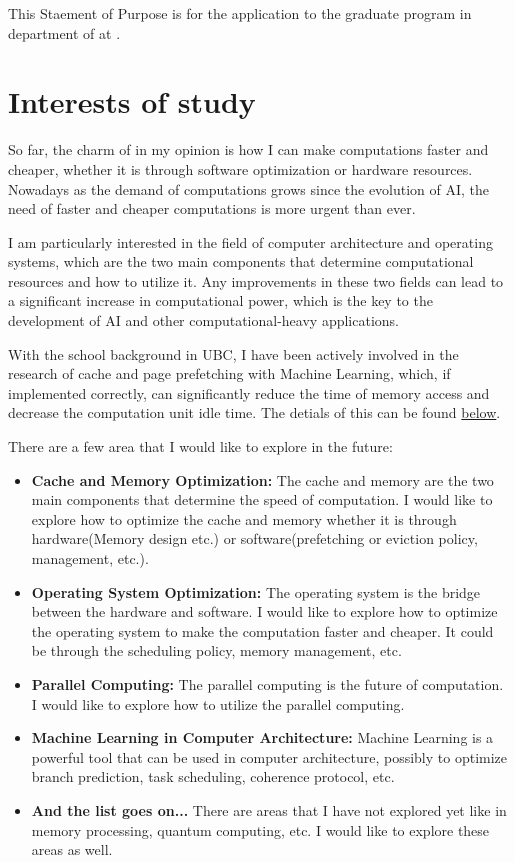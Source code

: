 \documentclass[a4 paper, 10pt]{article}
\begin{document}
{\selectfont %

This Staement of Purpose is for the application to the graduate program in department of \theDepartment{} at \theSchoolFullName{}.

\section*{Interests of study}
So far, the charm of \theDepartment{} in my opinion is how I can make computations faster and cheaper, whether it is through software optimization or hardware resources. Nowadays as the demand of computations grows since the evolution of AI, the need of faster and cheaper computations is more urgent than ever.

I am particularly interested in the field of computer architecture and operating systems, which are the two main components that determine computational resources and how to utilize it. Any improvements in these two fields can lead to a significant increase in computational power, which is the key to the development of AI and other computational-heavy applications.

With the school background in UBC, I have been actively involved in the research of cache and page prefetching with Machine Learning, which, if implemented correctly, can significantly reduce the time of memory access and decrease the computation unit idle time. The detials of this can be found \hyperref[prefetching]{below}.

There are a few area that I would like to explore in the future:\begin{itemize}
    \item \textbf{Cache and Memory Optimization:} The cache and memory are the two main components that determine the speed of computation. I would like to explore how to optimize the cache and memory whether it is through hardware(Memory design etc.) or software(prefetching or eviction policy, management, etc.).
    \item \textbf{Operating System Optimization:} The operating system is the bridge between the hardware and software. I would like to explore how to optimize the operating system to make the computation faster and cheaper. It could be through the scheduling policy, memory management, etc.
    \item \textbf{Parallel Computing:} The parallel computing is the future of computation. I would like to explore how to utilize the parallel computing.
    \item \textbf{Machine Learning in Computer Architecture:} Machine Learning is a powerful tool that can be used in computer architecture, possibly to optimize branch prediction, task scheduling, coherence protocol, etc.
    \item \textbf{And the list goes on...} There are areas that I have not explored yet like in memory processing, quantum computing, etc. I would like to explore these areas as well.
\end{itemize}
}
\end{document}
